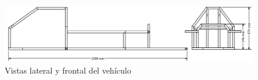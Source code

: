 \begin{figure}
\centering
\includegraphics[width=4.5in]{dibujos/chasis}
\caption{Vistas lateral y frontal del vehículo}
\label{fig:fotos:chasis}
\end{figure}
